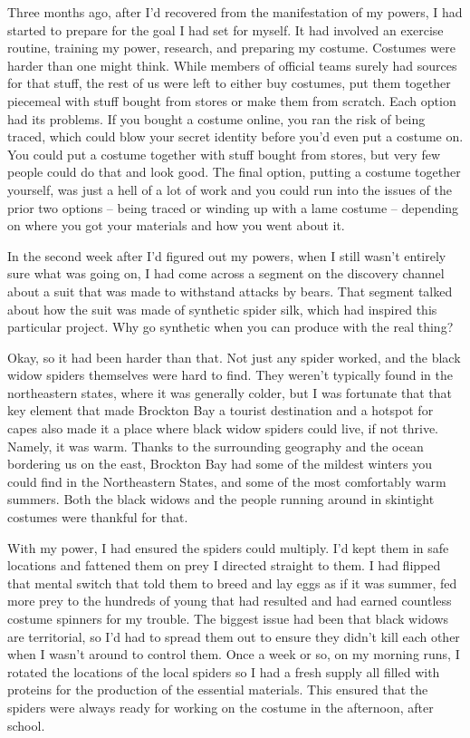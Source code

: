Three months ago, after I'd recovered from the manifestation of my powers, I had started to prepare for the goal I had set for myself. It had involved an exercise routine, training my power, research, and preparing my costume. Costumes were harder than one might think. While members of official teams surely had sources for that stuff, the rest of us were left to either buy costumes, put them together piecemeal with stuff bought from stores or make them from scratch. Each option had its problems. If you bought a costume online, you ran the risk of being traced, which could blow your secret identity before you'd even put a costume on. You could put a costume together with stuff bought from stores, but very few people could do that and look good. The final option, putting a costume together yourself, was just a hell of a lot of work and you could run into the issues of the prior two options -- being traced or winding up with a lame costume -- depending on where you got your materials and how you went about it.

In the second week after I'd figured out my powers, when I still wasn't entirely sure what was going on, I had come across a segment on the discovery channel about a suit that was made to withstand attacks by bears. That segment talked about how the suit was made of synthetic spider silk, which had inspired this particular project. Why go synthetic when you can produce with the real thing?

Okay, so it had been harder than that. Not just any spider worked, and the black widow spiders themselves were hard to find. They weren't typically found in the northeastern states, where it was generally colder, but I was fortunate that that key element that made Brockton Bay a tourist destination and a hotspot for capes also made it a place where black widow spiders could live, if not thrive. Namely, it was warm. Thanks to the surrounding geography and the ocean bordering us on the east, Brockton Bay had some of the mildest winters you could find in the Northeastern States, and some of the most comfortably warm summers. Both the black widows and the people running around in skintight costumes were thankful for that.

With my power, I had ensured the spiders could multiply. I'd kept them in safe locations and fattened them on prey I directed straight to them. I had flipped that mental switch that told them to breed and lay eggs as if it was summer, fed more prey to the hundreds of young that had resulted and had earned countless costume spinners for my trouble. The biggest issue had been that black widows are territorial, so I'd had to spread them out to ensure they didn't kill each other when I wasn't around to control them. Once a week or so, on my morning runs, I rotated the locations of the local spiders so I had a fresh supply all filled with proteins for the production of the essential materials. This ensured that the spiders were always ready for working on the costume in the afternoon, after school.

